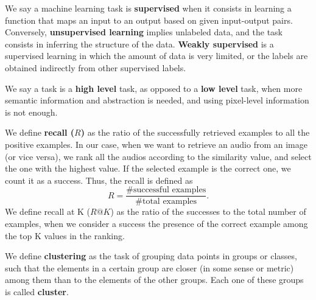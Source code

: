 \begin{definition}
\label{def:supervised}
We say a machine learning task is \textbf{supervised} when it consists in learning a function that maps an input to an output based on given input-output pairs. Conversely, \textbf{unsupervised learning} implies unlabeled data, and the task consists in inferring the structure of the data. \textbf{Weakly supervised} is a supervised learning in which the amount of data is very limited, or the labels are obtained indirectly from other supervised labels. 
\end{definition}

\begin{definition}
\label{def:high_level}
We say a task is a \textbf{high level} task, as opposed to a \textbf{low level} task, when more semantic information and abstraction is needed, and using pixel-level information is not enough.
\end{definition}

\begin{definition}
\label{def:recall}
We define \textbf{recall ($R$)} as the ratio of the successfully retrieved examples to all the positive examples. In our case, when we want to retrieve an audio from an image (or vice versa), we rank all the audios according to the similarity value, and select the one with the highest value. If the selected example is the correct one, we count it as a success. Thus, the recall is defined as 
\begin{equation}
R = \frac{\text{\# successful examples}}{\text{\# total examples}}.
\end{equation}
We define {recall at K ($R@K$)} as the ratio of the successes to the total number of examples, when we consider a success the presence of the correct example among the top K values in the ranking.
\end{definition}

\begin{definition}
\label{def:clustering}
We define \textbf{clustering} as the task of grouping data points in groups or classes, such that the elements in a certain group are closer (in some sense or metric) among them than to the elements of the other groups. Each one of these groups is called \textbf{cluster}.
\end{definition}



